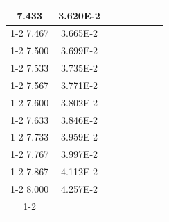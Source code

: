 \documentclass[article,12pt]{elsarticle}
\begin{document}
\begin{longtable}[c]{|c|c|cccccc}
7.433    & 3.620E-2  &                       &                              &                            &                       &                              &                               \\ \cline{1-2}
7.467    & 3.665E-2  &                       &                              &                            &                       &                              &                               \\ \cline{1-2}
7.500    & 3.699E-2  &                       &                              &                            &                       &                              &                               \\ \cline{1-2}
7.533    & 3.735E-2  &                       &                              &                            &                       &                              &                               \\ \cline{1-2}
7.567    & 3.771E-2  &                       &                              &                            &                       &                              &                               \\ \cline{1-2}
7.600    & 3.802E-2  &                       &                              &                            &                       &                              &                               \\ \cline{1-2}
7.633    & 3.846E-2  &                       &                              &                            &                       &                              &                               \\ \cline{1-2}
7.733    & 3.959E-2  &                       &                              &                            &                       &                              &                               \\ \cline{1-2}
7.767    & 3.997E-2  &                       &                              &                            &                       &                              &                               \\ \cline{1-2}
7.867    & 4.112E-2  &                       &                              &                            &                       &                              &                               \\ \cline{1-2}
8.000    & 4.257E-2  &                       &                              &                            &                       &                              &                               \\ \cline{1-2}

\end{longtable}
\end{document}
